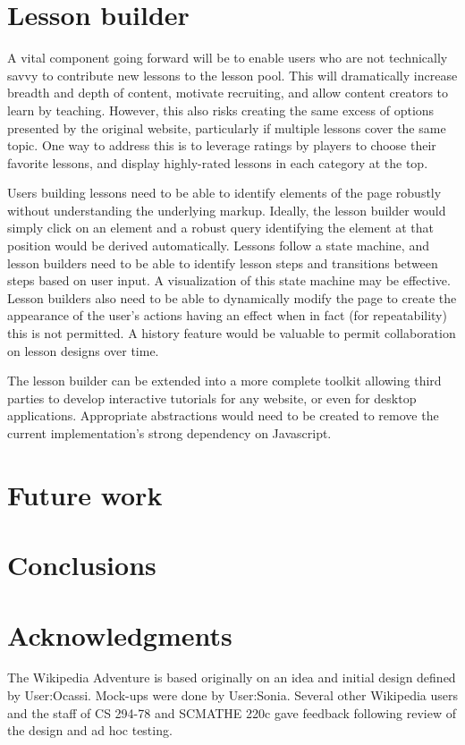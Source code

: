 \documentclass{acm_proc_article-sp}
\begin{document}
\section{Lesson builder}

A vital component going forward will be to enable users who are not technically savvy to contribute new lessons to the lesson pool. This will dramatically increase breadth and depth of content, motivate recruiting, and allow content creators to learn by teaching. However, this also risks creating the same excess of options presented by the original website, particularly if multiple lessons cover the same topic. One way to address this is to leverage ratings by players to choose their favorite lessons, and display highly-rated lessons in each category at the top.

Users building lessons need to be able to identify elements of the page robustly without understanding the underlying markup. Ideally, the lesson builder would simply click on an element and a robust query identifying the element at that position would be derived automatically. Lessons follow a state machine, and lesson builders need to be able to identify lesson steps and transitions between steps based on user input. A visualization of this state machine may be effective. Lesson builders also need to be able to dynamically modify the page to create the appearance of the user's actions having an effect when in fact (for repeatability) this is not permitted. A history feature would be valuable to permit collaboration on lesson designs over time.

The lesson builder can be extended into a more complete toolkit allowing third parties to develop interactive tutorials for any website, or even for desktop applications. Appropriate abstractions would need to be created to remove the current implementation's strong dependency on Javascript.

\section{Future work}

\section{Conclusions}

\section{Acknowledgments}
The Wikipedia Adventure is based originally on an idea and
initial design defined by User:Ocassi. Mock-ups
were done by User:Sonia. Several
other Wikipedia users and the staff of
CS 294-78 and SCMATHE 220c gave feedback following
review of the design and ad hoc testing.


\end{document}
